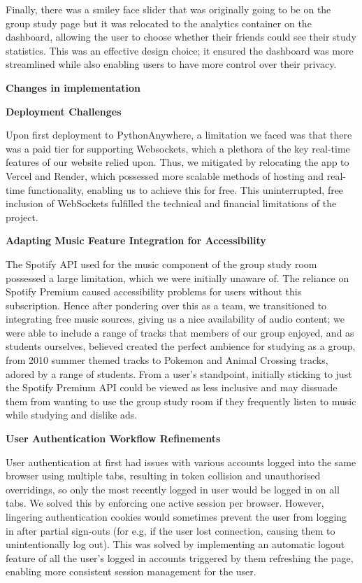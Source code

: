 Finally, there was a smiley face slider that was originally going to be on the group study page but it was relocated to the analytics container on the dashboard, allowing the user to choose whether their friends could see their study statistics. This was an effective design choice; it ensured the dashboard was more streamlined while also enabling users to have more control over their privacy. 

\textbf{Changes in implementation}

\textbf{Deployment Challenges} 

Upon first deployment to PythonAnywhere, a limitation we faced was that there was a paid tier for supporting Websockets, which a plethora of the key real-time features of our website relied upon. Thus, we mitigated by relocating the app to Vercel and Render, which possessed more scalable methods of hosting and real-time functionality, enabling us to achieve this for free. This uninterrupted, free inclusion of WebSockets fulfilled the technical and financial limitations of the project.

\textbf{Adapting Music Feature Integration for Accessibility}

The Spotify API used for the music component of the group study room possessed a large limitation, which we were initially unaware of. The reliance on Spotify Premium caused accessibility problems for users without this subscription. Hence after pondering over this as a team, we transitioned to integrating free music sources, giving us a nice availability of audio content; we were able to include a range of tracks that members of our group enjoyed, and as students ourselves, believed created the perfect ambience for studying as a group, from 2010 summer themed tracks to Pokemon and Animal Crossing tracks, adored by a range of students. From a user's standpoint, initially sticking to just the Spotify Premium API could be viewed as less inclusive and may dissuade them from wanting to use the group study room if they frequently listen to music while studying and dislike ads.

\textbf{User Authentication Workflow Refinements}

User authentication at first had issues with various accounts logged into the same browser using multiple tabs, resulting in token collision and unauthorised overridings, so only the most recently logged in user would be logged in on all tabs. We solved this by enforcing one active session per browser. However, lingering authentication cookies would sometimes prevent the user from logging in after partial sign-outs (for e.g, if the user lost connection, causing them to unintentionally log out). This was solved by implementing an automatic logout feature of all the user's logged in accounts triggered by them refreshing the page, enabling more consistent session management for the user.

